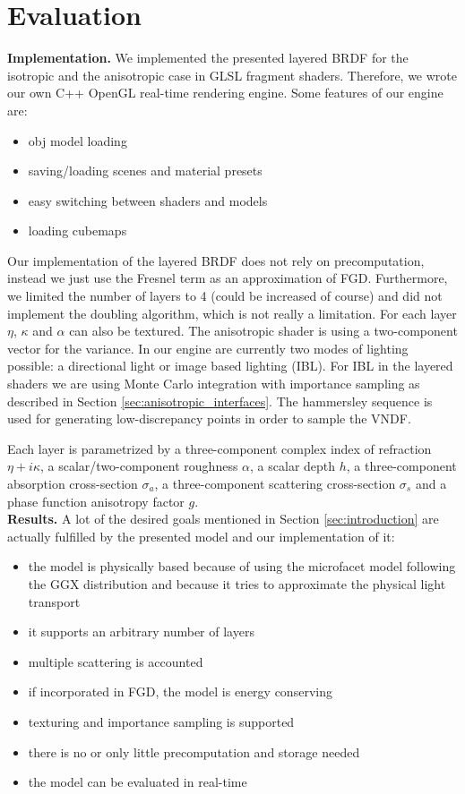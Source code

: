 \section{Evaluation}
\label{sec:evaluation}

\textbf{Implementation.} We implemented the presented layered BRDF for the isotropic and the anisotropic case in GLSL fragment shaders. Therefore, we wrote our own C++ OpenGL real-time rendering engine. Some features of our engine are:
\begin{itemize}
    \item obj model loading
    \item saving/loading scenes and material presets
    \item easy switching between shaders and models
    \item loading cubemaps
\end{itemize}
Our implementation of the layered BRDF does not rely on precomputation, instead we just use the Fresnel term as an approximation of FGD. Furthermore, we limited the number of layers to 4 (could be increased of course) and did not implement the doubling algorithm, which is not really a limitation. For each layer $\eta$, $\kappa$ and $\alpha$ can also be textured. The anisotropic shader is using a two-component vector for the variance. In our engine are currently two modes of lighting possible: a directional light or image based lighting (IBL). For IBL in the layered shaders we are using Monte Carlo integration with importance sampling as described in Section \ref{sec:anisotropic_interfaces}. The hammersley sequence is used for generating low-discrepancy points in order to sample the VNDF.

%

Each layer is parametrized by a three-component complex index of refraction $\eta + i \kappa$, a scalar/two-component roughness $\alpha$, a scalar depth $h$, a three-component absorption cross-section $\sigma_a$, a three-component scattering cross-section $\sigma_s$ and a phase function anisotropy factor $g$.\\

%

\noindent\textbf{Results.} A lot of the desired goals mentioned in Section \ref{sec:introduction} are actually fulfilled by the presented model and our implementation of it:
\begin{itemize}
    \item the model is physically based because of using the microfacet model following the GGX distribution and because it tries to approximate the physical light transport
    \item it supports an arbitrary number of layers
    \item multiple scattering is accounted
    \item if incorporated in FGD, the model is energy conserving
    \item texturing and importance sampling is supported
    \item there is no or only little precomputation and storage needed
    \item the model can be evaluated in real-time
\end{itemize}

